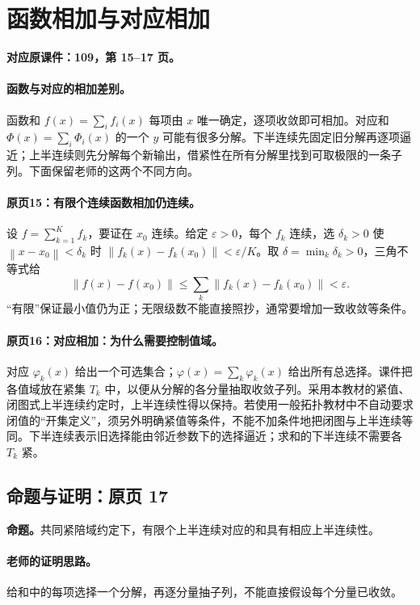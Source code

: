 \documentclass[11pt,a4paper]{article}
\newcommand{\eps}{\varepsilon}
\newcommand{\norm}[1]{\left\lVert#1\right\rVert}
\theoremstyle{definition}\newtheorem{definition}{定义}\newtheorem{example}{例}
\begin{document}
\clearpage\section{函数相加与对应相加}\label{g:109:15}

\textbf{对应原课件：109，第 15--17 页。}


\paragraph{函数与对应的相加差别。}
函数和 $f(x)=\sum_i f_i(x)$ 每项由 $x$ 唯一确定，逐项收敛即可相加。对应和 $\Phi(x)=\sum_i\Phi_i(x)$ 的一个 $y$ 可能有很多分解。下半连续先固定旧分解再逐项逼近；上半连续则先分解每个新输出，借紧性在所有分解里找到可取极限的一条子列。下面保留老师的这两个不同方向。


\paragraph{原页15：有限个连续函数相加仍连续。}设 $f=\sum_{k=1}^K f_k$，要证在 $x_0$ 连续。给定 $\eps>0$，每个 $f_k$ 连续，选 $\delta_k>0$ 使 $\norm{x-x_0}<\delta_k$ 时 $\norm{f_k(x)-f_k(x_0)}<\eps/K$。取 $\delta=\min_k\delta_k>0$，三角不等式给
\[\norm{f(x)-f(x_0)}\le\sum_k\norm{f_k(x)-f_k(x_0)}<\eps.\]
“有限”保证最小值仍为正；无限级数不能直接照抄，通常要增加一致收敛等条件。



\paragraph{原页16：对应相加：为什么需要控制值域。}对应 $\varphi_k(x)$ 给出一个可选集合；$\varphi(x)=\sum_k\varphi_k(x)$ 给出所有总选择。课件把各值域放在紧集 $T_k$ 中，以便从分解的各分量抽取收敛子列。采用本教材的紧值、闭图式上半连续约定时，上半连续性得以保持。若使用一般拓扑教材中不自动要求闭值的“开集定义”，须另外明确紧值等条件，不能不加条件地把闭图与上半连续等同。下半连续表示旧选择能由邻近参数下的选择逼近；求和的下半连续不需要各 $T_k$ 紧。



\subsection{命题与证明：原页 17}

\textbf{命题。}共同紧陪域约定下，有限个上半连续对应的和具有相应上半连续性。

\paragraph{老师的证明思路。}给和中的每项选择一个分解，再逐分量抽子列，不能直接假设每个分量已收敛。
\end{document}
